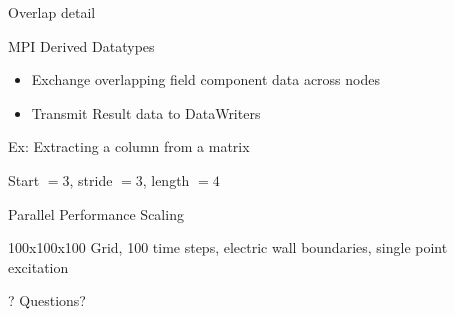 \documentclass[pdf, nototal, slideBW]{prosper}
\newcommand{\insgraphic}[2]{
  \begin{center}
    \scalebox{#1}{
      \texttt{[image: \#2]}
    }
  \end{center}
}
\begin{document}
\begin{slide}{Overlap detail}
  
\end{slide}

\begin{slide}{MPI Derived Datatypes}
  
  \begin{itemize}
  \item Exchange overlapping field component data across nodes
  \item Transmit Result data to DataWriters
  \end{itemize}

  Ex: Extracting a column from a matrix
  \insgraphic{1}{mpi-datatypes.eps}
  Start $= 3$, stride $= 3$, length $= 4$
\end{slide}

\begin{slide}{Parallel Performance Scaling}
  
  100x100x100 Grid, 100 time steps, electric wall boundaries, single
  point excitation
\end{slide}

\begin{slide}{?}
\huge
\vspace{1cm}
Questions?
\end{slide}
\end{document}
